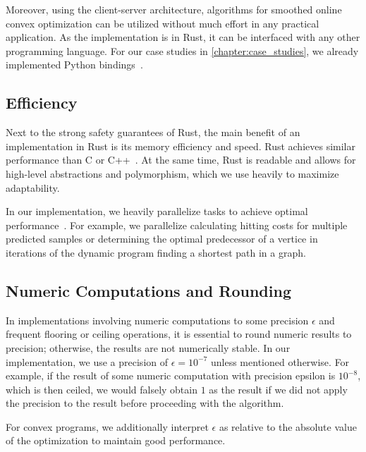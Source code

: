 Moreover, using the client-server architecture, algorithms for smoothed online convex optimization can be utilized without much effort in any practical application. As the implementation is in Rust, it can be interfaced with any other programming language. For our case studies in \cref{chapter:case_studies}, we already implemented Python bindings~\cite{Huebotter2021_3}.

\subsection{Efficiency}

Next to the strong safety guarantees of Rust, the main benefit of an implementation in Rust is its memory efficiency and speed. Rust achieves similar performance than C or C++~\cite{Benchmarksgame, Rust, Perkel2020}. At the same time, Rust is readable and allows for high-level abstractions and polymorphism, which we use heavily to maximize adaptability.

In our implementation, we heavily parallelize tasks to achieve optimal performance~\cite{Matsakis2015}. For example, we parallelize calculating hitting costs for multiple predicted samples or determining the optimal predecessor of a vertice in iterations of the dynamic program finding a shortest path in a graph.

\subsection{Numeric Computations and Rounding}

In implementations involving numeric computations to some precision $\epsilon$ and frequent flooring or ceiling operations, it is essential to round numeric results to precision; otherwise, the results are not numerically stable. In our implementation, we use a precision of $\epsilon = 10^{-7}$ unless mentioned otherwise. For example, if the result of some numeric computation with precision epsilon is $10^{-8}$, which is then ceiled, we would falsely obtain $1$ as the result if we did not apply the precision to the result before proceeding with the algorithm.

For convex programs, we additionally interpret $\epsilon$ as relative to the absolute value of the optimization to maintain good performance.
